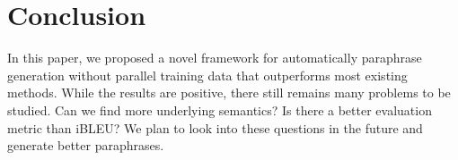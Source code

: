 \section{Conclusion}
In this paper, we proposed a novel framework for automatically paraphrase generation without parallel training data that outperforms most existing methods. While the results are positive, there still remains many problems to be studied. Can we find more underlying semantics? Is there a better evaluation metric than iBLEU? We plan to look into these questions in the future and generate better paraphrases. 
